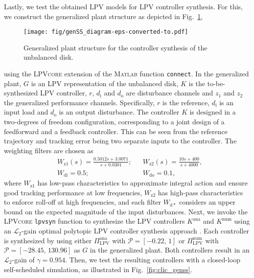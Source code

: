 Lastly, we test the obtained LPV models for LPV controller synthesis. For this, we construct the generalized plant structure %
as depicted in Fig.~\ref{fig:genSS},
\begin{figure}[t]
    \centering
    \texttt{[image: fig/genSS\_diagram-eps-converted-to.pdf]}
    \caption{Generalized plant structure for the controller synthesis of the unbalanced disk.}
    \label{fig:genSS}
\end{figure}
using the \textsc{LPVcore} extension of the \textsc{Matlab} function \lstinline{connect}. In the generalized plant, $G$ is an LPV representation of the unbalanced disk, $K$ is the to-be-synthesized LPV controller, $r$, $d_\mathrm{i}$ and $d_\mathrm{o}$ are disturbance channels and $z_1$ and $z_2$ the generalized performance channels. Specifically, $r$ is the reference, $d_\mathrm{i}$ is an input load and $d_\mathrm{o}$ is an output disturbance. The controller $K$ is designed in a two-degrees of freedom configuration, corresponding to a joint design of a feedforward and a feedback controller. This can be seen from the reference trajectory and tracking error being two separate inputs to the controller. The weighting filters are chosen as
    \begin{align}
         & W_{\mathrm{z1}}(s)  = \frac{0.5012s + 3.0071}{s + 0.0301}; &  & W_\mathrm{z2} (s)  = \frac{10s + 400}{s + 4000}, \nonumber \\
         & W_\mathrm{di}       = 0.5;                                 &  & W_\mathrm{do}      = 0.1,
    \end{align}
    where $W_{\mathrm{z1}}$ has low-pass characteristics to approximate integral action and ensure good tracking performance at low frequencies, $W_{\mathrm{z2}}$ has high-pass characteristics to enforce roll-off at high frequencies, and each filter $W_\mathrm{d\ast}$ considers an upper bound on the expected magnitude of the input disturbances.
    Next, we invoke the \textsc{LPVcore} \lstinline{lpvsyn} function to synthesize the LPV controllers $K^\mathrm{ana}$ and $K^\mathrm{num}$ using an $\mathcal{L}_2$-gain optimal polytopic LPV controller synthesis approach \cite{APKARIAN19951251}. Each controller is synthesized by using either $\Pi_\mathrm{LPV}^\mathrm{ana}$ with $\mathcal{P}=[-0.22, \, 1]$ or $\Pi_\mathrm{LPV}^\mathrm{num}$ with $\mathcal{P}=[-28.45, \, 130.96]$ as $G$ in the generalized plant. Both controllers result in an $\mathcal{L}_2$-gain of $\gamma = 0.954$. Then, we test the resulting controllers with a closed-loop self-scheduled simulation, as illustrated in Fig.~\ref{fig:clic_genss}.
